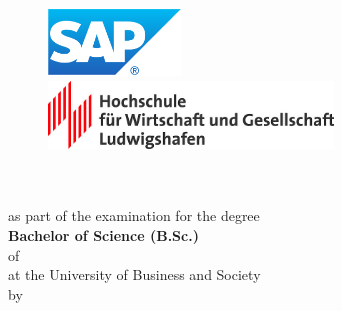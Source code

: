 \thispagestyle{empty}
\begin{titlepage}
\enlargethispage{4cm}

\begin{figure}           %
	\begin{minipage}{0.49\textwidth}
		\flushleft
		\includegraphics[height=1.8cm]{Bilder/Logos/Logo_SAP.pdf} 
	\end{minipage}
	\hfill
	\begin{minipage}{0.49\textwidth}
		\flushright
		\includegraphics[height=1.8cm]{Bilder/Logos/Logo_HWG-Lu.jpg} 
	\end{minipage}
\end{figure} 
\vspace*{0.1cm}

\begin{center}
	\huge{\textbf{\titel}}\\[1.5cm]
	\Large{\textbf{\arbeit}}\\[0.5cm]
	\normalsize{as part of the examination for the degree\\[1ex] \textbf{Bachelor of Science (B.Sc.)}}\\[0.5cm]
	\Large{of \studiengang}\\[1ex]
	\normalsize{at the University of Business and Society}\\[1cm]
	\normalsize{by}\\[1ex] \Large{\textbf{\autor}} \\[1cm]
\end{center}


\end{titlepage}
